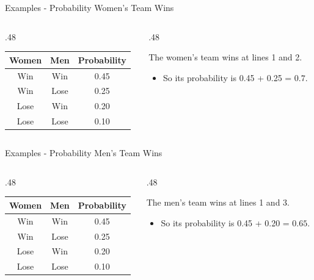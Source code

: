 \documentclass[
  ignorenonframetext,
]{beamer}
\providecommand{\tightlist}{%
  \setlength{\itemsep}{0pt}\setlength{\parskip}{0pt}}
\renewcommand{\,}{\text{, }}
\def\begincols{\begin{columns}}
\def\begincol{\begin{column}}
\def\endcol{\end{column}}
\def\endcols{\end{columns}}
\begin{document}
\begin{frame}{Examples - Probability Women's Team Wins}
\protect\hypertarget{examples---probability-womens-team-wins}{}

\begincols
\begincol{.48\textwidth}

\begin{longtable}[]{@{}ccc@{}}
\toprule
Women & Men & Probability\tabularnewline
\midrule
\endhead
Win & Win & 0.45\tabularnewline
Win & Lose & 0.25\tabularnewline
Lose & Win & 0.20\tabularnewline
Lose & Lose & 0.10\tabularnewline
\bottomrule
\end{longtable}

\endcol
\begincol{.48\textwidth}

The women's team wins at lines 1 and 2.

\begin{itemize}
\tightlist
\item
  So its probability is 0.45 + 0.25 = \(0.7\).
\end{itemize}

\endcol
\endcols

\end{frame}

\begin{frame}{Examples - Probability Men's Team Wins}
\protect\hypertarget{examples---probability-mens-team-wins}{}

\begincols
\begincol{.48\textwidth}

\begin{longtable}[]{@{}ccc@{}}
\toprule
Women & Men & Probability\tabularnewline
\midrule
\endhead
Win & Win & 0.45\tabularnewline
Win & Lose & 0.25\tabularnewline
Lose & Win & 0.20\tabularnewline
Lose & Lose & 0.10\tabularnewline
\bottomrule
\end{longtable}

\endcol
\begincol{.48\textwidth}

The men's team wins at lines 1 and 3.

\begin{itemize}
\tightlist
\item
  So its probability is 0.45 + 0.20 = \(0.65\).
\end{itemize}

\endcol
\endcols

\end{frame}
\end{document}
